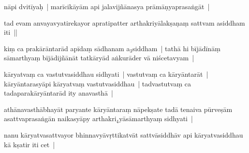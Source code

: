 \documentclass[article,12pt,a4paper]{memoir}%
\newcounter{parCount}
\begin{document}
	  \pstart \leavevmode%
	\label{thakur75-71.9}nāpi dvitīyaḥ | marīcikāyām api jalavijñānasya prāmāṇyaprasaṅgāt |
	{}
	\pend%
      

	  \pstart \leavevmode%
	\label{thakur75-71.9a}tad evam anvayavyatirekayor apratipatter arthakriyālakṣaṇaṃ sattvam asiddham iti ||
	{}
	\pend%
      

	  \pstart \leavevmode%
	\label{thakur75-71.11}kiṃ ca prakārāntarād apīdaṃ sādhanam a{\tiny $_{3}$}siddham | tathā hi bījādīnāṃ sāmarthyaṃ bījādijñānāt tatkāryād aṅkurāder vā niścetavyam |
	{}
	\pend%
      

	  \pstart \leavevmode%
	\label{thakur75-71.12}kāryatvaṃ ca vastutvasiddhau sidhyati | vastutvaṃ ca kāryāntarāt | kāryāntarasyāpi kāryatvaṃ vastutvasiddhau | tadvastutvaṃ ca tadaparakāryāntarād ity anavasthā |
	{}
	\pend%
      

	  \pstart \leavevmode%
	\label{thakur75-71.15}athānavasthābhayāt paryante kāryāntaraṃ nāpekṣate tadā tenaiva pūrveṣām asattvaprasaṅgān naikasyāpy arthakri{\tiny $_{4}$}yāsāmarthyaṃ sidhyati |
	{}
	\pend%
      

	  \pstart \leavevmode%
	\label{thakur75-71.17}nanu kāryatvasattvayor bhinnavyāvṛttikatvāt \label{ratnakīrtinibandhāvali__36r1PF7IMUT19YJQJP8HLZNIM4Y}sattvāsiddhāv\label{ratnakīrtinibandhāvali__36r1PF7IMURRIVO388ZTVNIPXXN} api kāryatvasiddhau kā kṣatir iti cet |
	{}
	\pend%
      
\end{document}
